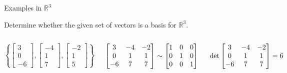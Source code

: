 \documentclass[xcolor=dvipsnames,aspectratio=169,t]{beamer}
\begin{document}
\begin{frame}{Examples in $\mathbb{R}^3$}

Determine whether the given set of vectors is a basis for $\mathbb{R}^3$. %


\begin{columns}[T]

\column{0.5\tw}

$\left\{ \begin{bmatrix} 3 \\ 0 \\ -6 \end{bmatrix} , \begin{bmatrix} -4 \\ 1 \\ 7 \end{bmatrix} , \begin{bmatrix} -2 \\ 1 \\ 5 \end{bmatrix} \right\}$   \bs

\pause
$\displaystyle \begin{bmatrix} 3 & -4 & -2 \\ 0 & 1 & 1 \\ -6 & 7 & 7 \end{bmatrix} \sim \begin{bmatrix} 1 & 0 & 0 \\ 0 & 1 & 0 \\ 0 & 0 & 1 \end{bmatrix}$ \ms

$\displaystyle \det \begin{bmatrix} 3 & -4 & -2 \\ 0 & 1 & 1 \\ -6 & 7 & 7 \end{bmatrix} = 6$



\end{columns}
\end{frame}
\end{document}
